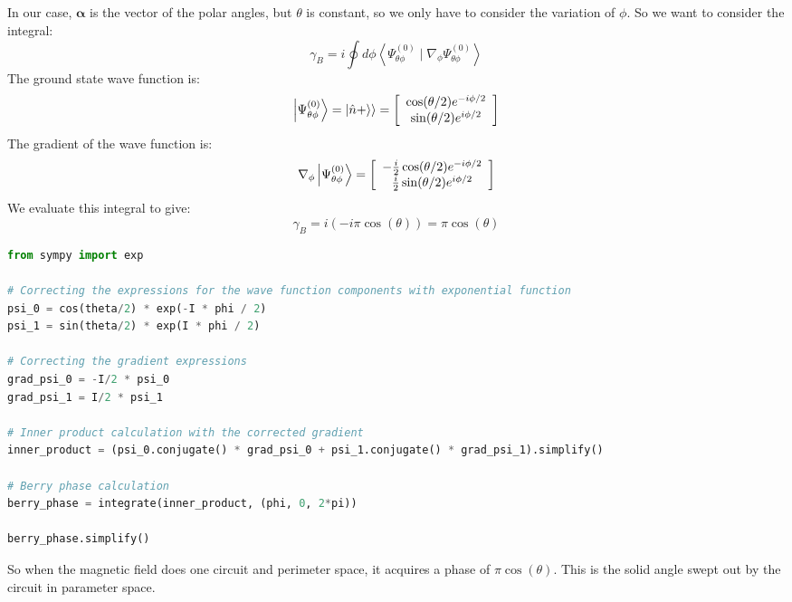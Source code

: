 \documentclass[12pt]{article}
\begin{document}
\subsection{}
In our case, $\boldsymbol{\alpha}$ is the vector of the polar angles, but $\theta $ is constant, so we only have to consider the variation of $\phi$. 
So we want to consider the integral:
\begin{equation}
  \gamma_B=i\oint d \phi \left\langle\Psi _{\theta \phi}^{(0)}\mid \nabla_{\phi} \Psi _{\theta \phi}^{(0)}\right\rangle
\end{equation}
The ground state wave function is:
\begin{equation}
  \ket{\Psi _{\theta \phi}^{(0)}} = \ket{\hat{n}+\rangle} = \left[\begin{array}{c}
\cos (\theta / 2) e^{-i \phi / 2} \\
\sin (\theta / 2) e^{i \phi / 2}
\end{array}\right]
\end{equation}
The gradient of the wave function is:
\begin{equation}
  \nabla_{\phi}\ket{\Psi _{\theta \phi}^{(0)}} = \left[\begin{array}{c}
-\frac{i}{2}\cos (\theta / 2) e^{-i \phi / 2} \\
\frac{i}{2}\sin (\theta / 2) e^{i \phi / 2}
\end{array}\right]
\end{equation}
We evaluate this integral to give:
\begin{equation}
\gamma_B=i(-i \pi \cos (\theta)) = \pi \cos (\theta)
\end{equation}
\begin{lstlisting}[language=Python]
from sympy import exp

# Correcting the expressions for the wave function components with exponential function
psi_0 = cos(theta/2) * exp(-I * phi / 2)
psi_1 = sin(theta/2) * exp(I * phi / 2)

# Correcting the gradient expressions
grad_psi_0 = -I/2 * psi_0
grad_psi_1 = I/2 * psi_1

# Inner product calculation with the corrected gradient
inner_product = (psi_0.conjugate() * grad_psi_0 + psi_1.conjugate() * grad_psi_1).simplify()

# Berry phase calculation
berry_phase = integrate(inner_product, (phi, 0, 2*pi))

berry_phase.simplify()
\end{lstlisting}
So when the magnetic field does one circuit and perimeter space, it acquires a phase of $\pi \cos (\theta)$. This is the solid angle swept out by the circuit in parameter space.
\end{document}
